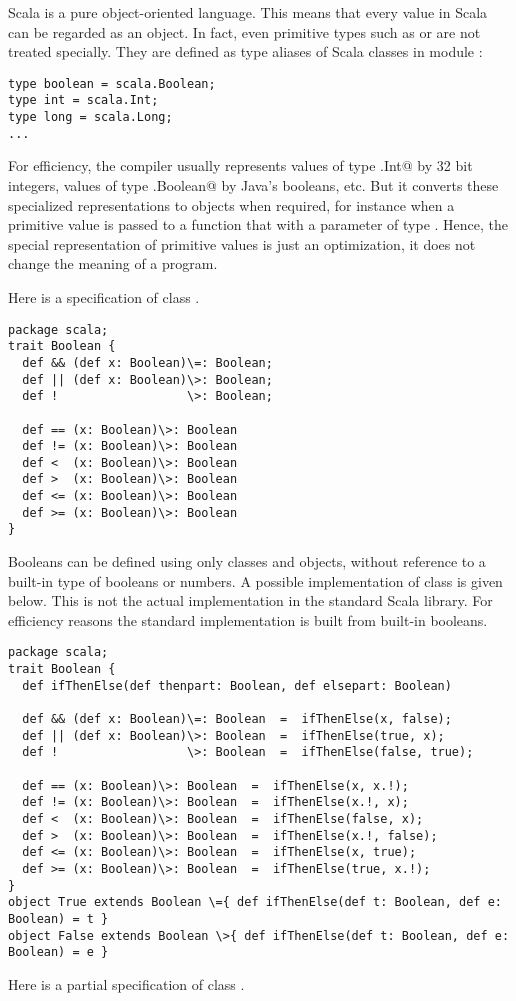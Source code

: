 \documentclass[11pt]{book}
\begin{document}
Scala is a pure object-oriented language. This means that every value
in Scala can be regarded as an object.  In fact, even primitive types
such as \verb@int@ or \verb@boolean@ are not treated specially. They
are defined as type aliases of Scala classes in module \verb@Predef@:
\begin{verbatim}
type boolean = scala.Boolean;
type int = scala.Int;
type long = scala.Long;
...
\end{verbatim}
For efficiency, the compiler usually represents values of type
\verb@scala.Int@ by 32 bit integers, values of type
\verb@scala.Boolean@ by Java's booleans, etc.  But it converts these
specialized representations to objects when required, for instance
when a primitive \verb@int@ value is passed to a function that with a
parameter of type \verb@Object@.  Hence, the special representation of
primitive values is just an optimization, it does not change the
meaning of a program.

Here is a specification of class \verb@Boolean@.
\begin{verbatim}
package scala;
trait Boolean {
  def && (def x: Boolean)\=: Boolean;
  def || (def x: Boolean)\>: Boolean;
  def !                  \>: Boolean;

  def == (x: Boolean)\>: Boolean
  def != (x: Boolean)\>: Boolean
  def <  (x: Boolean)\>: Boolean
  def >  (x: Boolean)\>: Boolean
  def <= (x: Boolean)\>: Boolean
  def >= (x: Boolean)\>: Boolean
}
\end{verbatim}
Booleans can be defined using only classes and objects, without
reference to a built-in type of booleans or numbers. A possible
implementation of class \verb@Boolean@ is given below.  This is not
the actual implementation in the standard Scala library. For
efficiency reasons the standard implementation is built from built-in
booleans.
\begin{verbatim}
package scala;
trait Boolean {
  def ifThenElse(def thenpart: Boolean, def elsepart: Boolean)

  def && (def x: Boolean)\=: Boolean  =  ifThenElse(x, false);
  def || (def x: Boolean)\>: Boolean  =  ifThenElse(true, x);
  def !                  \>: Boolean  =  ifThenElse(false, true);

  def == (x: Boolean)\>: Boolean  =  ifThenElse(x, x.!);
  def != (x: Boolean)\>: Boolean  =  ifThenElse(x.!, x);
  def <  (x: Boolean)\>: Boolean  =  ifThenElse(false, x);
  def >  (x: Boolean)\>: Boolean  =  ifThenElse(x.!, false);
  def <= (x: Boolean)\>: Boolean  =  ifThenElse(x, true);
  def >= (x: Boolean)\>: Boolean  =  ifThenElse(true, x.!);
}
object True extends Boolean \={ def ifThenElse(def t: Boolean, def e: Boolean) = t }
object False extends Boolean \>{ def ifThenElse(def t: Boolean, def e: Boolean) = e }
\end{verbatim}
Here is a partial specification of class \verb@Int@.
\end{document}
